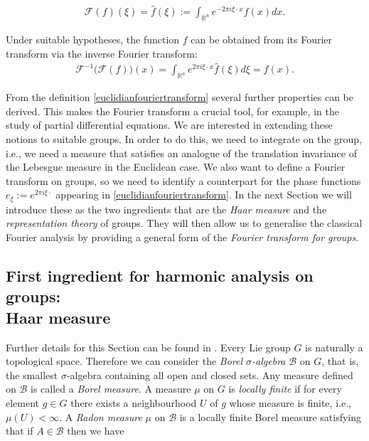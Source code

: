 \documentclass[12pt,oneside,a4paper]{book}
\numberwithin{equation}{section}     %
\theoremstyle{plain}
\theoremstyle{definition}
\newcommand{\R}{{\mathbb R}}
\newcommand{\Rn}{{\R}^n}
\begin{document}
\begin{align}\label{euclidianfouriertransform}
\mathcal F(f)(\xi)=\widehat{f}(\xi):=\int_{\Rn}e^{-2\pi i \xi\cdot x}f(x)dx.
\end{align}

Under suitable hypotheses, the function $f$ can be obtained from its Fourier transform via the inverse Fourier transform:
\begin{align*}
\mathcal F ^{-1} \big(\mathcal{F}(f)\big)(x)=\int_{\Rn}e^{2\pi i \xi\cdot x}\widehat{f}(\xi)d\xi=f(x).
\end{align*}

From the definition \eqref{euclidianfouriertransform} several further properties can be derived. This makes the Fourier transform a crucial tool, for example, in the study of partial differential equations. We are interested in extending these notions to suitable groups. In order to do this, we need to integrate on the group, i.e., we need a measure that satisfies an analogue of the translation invariance of the Lebesgue measure in the Euclidean case. We also want to define a Fourier transform on groups, so we need to identify a counterpart for the phase functions $e_{\xi}:=e^{2\pi i \xi\cdot}$ appearing in \eqref{euclidianfouriertransform}. In the next Section we will introduce these as the two ingredients that are the \textit{Haar measure} and the \textit{representation theory} of groups. They will then allow us to generalise the classical Fourier analysis by providing a general form of the \textit{Fourier transform for groups}.



\subsection{First ingredient for harmonic analysis on groups:\\ Haar measure}

Further details for this Section can be found in \cite{DE2009,FR2016}. Every Lie group $G$ is naturally a topological space. Therefore we can consider the \textit{Borel $\sigma$-algebra} $\mathcal{B}$ on $G$, that is, the smallest $\sigma$-algebra containing all open and closed sets. Any measure defined on $\mathcal{B}$ is called a \textit{Borel measure}. A measure $\mu$ on $G$ is \textit{locally finite} if for every element $g\in G$ there exists a neighbourhood $U$ of $g$ whose measure is finite, i.e., $\mu(U)<\infty$. A \textit{Radon measure} $\mu$ on $\mathcal{B}$ is a locally finite Borel measure satisfying that if $A\in\mathcal{B}$ then we have
\end{document}
